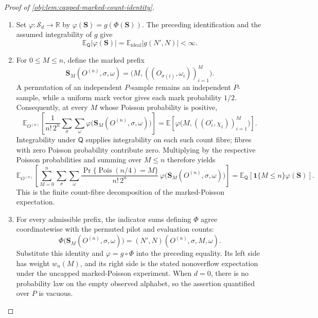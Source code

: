 \documentclass[11pt]{article}
\begin{document}
\begin{proof}[Proof of \cref{obj:lem:capped-marked-count-identity}]
\begin{enumerate}
\item Set \(\varphi:\mathcal S_d\to\mathbb R\) by \(\varphi(\mathbf S)=g(\Phi(\mathbf S))\). The preceding identification and the assumed integrability of \(g\) give
\[
\mathbb E_{\mathsf Q}|\varphi(\mathbf S)|
=\mathbb E_{\mathrm{ideal}}|g(N',N)|<\infty.
\]

\item For \(0\leq M\leq n\), define the marked prefix
\[
\mathbf S_M(O^{(n)},\sigma,\omega)
=\bigl(M,((O_{\sigma(i)},\omega_i))_{i=1}^M\bigr).
\]
A permutation of an independent \(P\)-sample remains an independent \(P\)-sample, while a uniform mark vector gives each mark probability \(1/2\). Consequently, at every \(M\) whose Poisson probability is positive,
\[
\mathbb E_{O^{(n)}}\!\left[
 \frac1{n!\,2^n}\sum_{\sigma}\sum_{\omega}
 \varphi\bigl(\mathbf S_M(O^{(n)},\sigma,\omega)\bigr)
 \right]
=
\mathbb E\!\left[
 \varphi\bigl(M,((O_i^\circ,\chi_i))_{i=1}^M\bigr)\right].
\]
Integrability under \(\mathsf Q\) supplies integrability on each such count fibre; fibres with zero Poisson probability contribute zero. Multiplying by the respective Poisson probabilities and summing over \(M\leq n\) therefore yields
\[
\mathbb E_{O^{(n)}}\!\left[
 \sum_{M=0}^n\sum_{\sigma}\sum_{\omega}
 \frac{\Pr\{\operatorname{Pois}(n/4)=M\}}{n!\,2^n}\,
 \varphi\bigl(\mathbf S_M(O^{(n)},\sigma,\omega)\bigr)
 \right]
=
\mathbb E_{\mathsf Q}\!\left[
 \mathbf1\{M\leq n\}\varphi(\mathbf S)\right].
\]
This is the finite count-fibre decomposition of the marked-Poisson expectation.

\item For every admissible prefix, the indicator sums defining \(\Phi\) agree coordinatewise with the permuted pilot and evaluation counts:
\[
\Phi\bigl(\mathbf S_M(O^{(n)},\sigma,\omega)\bigr)
=(N',N)(O^{(n)},\sigma,M,\omega).
\]
Substitute this identity and \(\varphi=g\circ\Phi\) into the preceding equality. Its left side has weight \(w_n(M)\), and its right side is the stated nonoverflow expectation under the uncapped marked-Poisson experiment. When \(d=0\), there is no probability law on the empty observed alphabet, so the assertion quantified over \(P\) is vacuous.
\end{enumerate}
\end{proof}
\end{document}
